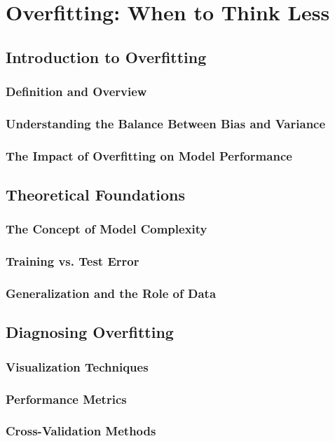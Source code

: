 \documentclass[12pt]{book} %
\begin{document}
\chapter{Overfitting: When to Think Less}

\section{Introduction to Overfitting}
\subsection{Definition and Overview}
\subsection{Understanding the Balance Between Bias and Variance}
\subsection{The Impact of Overfitting on Model Performance}

\section{Theoretical Foundations}
\subsection{The Concept of Model Complexity}
\subsection{Training vs. Test Error}
\subsection{Generalization and the Role of Data}

\section{Diagnosing Overfitting}
\subsection{Visualization Techniques}
\subsection{Performance Metrics}
\subsection{Cross-Validation Methods}
\end{document}
